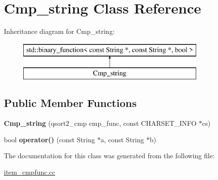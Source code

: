 \hypertarget{classCmp__string}{}\section{Cmp\+\_\+string Class Reference}
\label{classCmp__string}
Inheritance diagram for Cmp\+\_\+string\+:\begin{figure}[H]
\begin{center}
\leavevmode
\includegraphics[height=2.000000cm]{classCmp__string}
\end{center}
\end{figure}
\subsection*{Public Member Functions}
\begin{DoxyCompactItemize}
\item 
\mbox{\label{classCmp__string_a12a06010564dfdbbdd2de2437d87622a}} 
{\bfseries Cmp\+\_\+string} (qsort2\+\_\+cmp cmp\+\_\+func, const C\+H\+A\+R\+S\+E\+T\+\_\+\+I\+N\+FO $\ast$cs)
\item 
\mbox{\label{classCmp__string_adbe137793cfc2c8038ed7eb9cfffd789}} 
bool {\bfseries operator()} (const String $\ast$a, const String $\ast$b)
\end{DoxyCompactItemize}


The documentation for this class was generated from the following file\+:\begin{DoxyCompactItemize}
\item 
\mbox{\hyperlink{item__cmpfunc_8cc}{item\+\_\+cmpfunc.\+cc}}\end{DoxyCompactItemize}
